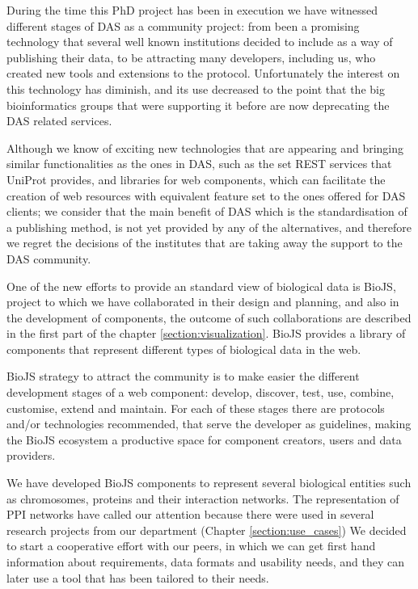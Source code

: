 During the time this PhD project has been in execution we have witnessed different stages of DAS as a community project: from been a promising technology that several well known institutions decided to include as a way of publishing their data, to be attracting many developers, including us, who created new tools and extensions to the protocol. Unfortunately the interest on this technology has diminish, and its use decreased to the point that the big bioinformatics groups that were supporting it before are now deprecating the DAS related services.

Although we know of exciting new technologies that are appearing and bringing similar functionalities as the ones in DAS, such as the set REST services that UniProt provides, and libraries for web components, which can facilitate the creation of web resources with equivalent feature set to the ones offered for DAS clients; we consider that the main benefit of DAS which is the standardisation of a publishing method, is not yet provided by any of the alternatives, and therefore we regret the decisions of the institutes that are taking away the support to the DAS community.

\vspace{5mm}

One of the new efforts to provide an standard view of biological data is BioJS, project to which we have collaborated in their design and planning, and also in the development of components, the outcome of such collaborations are described in the first part of the chapter \ref{section:visualization}. BioJS provides a library of components that represent different types of biological data in the web. 

BioJS strategy to attract the community is to make easier the different development stages of a web component: develop, discover, test, use, combine, customise, extend and maintain. For each of these stages there are protocols and/or technologies recommended, that serve the developer as guidelines, making the BioJS ecosystem a productive space for component creators, users and data providers.

We have developed BioJS components to represent several biological entities such as chromosomes, proteins and their interaction networks. The representation of PPI networks have called our attention because there were used in several research projects from our department (Chapter \ref{section:use_cases}) We decided to start a cooperative effort with our peers, in which we can get first hand information about requirements, data formats and usability needs, and they can later use a tool that has been tailored to their needs.

